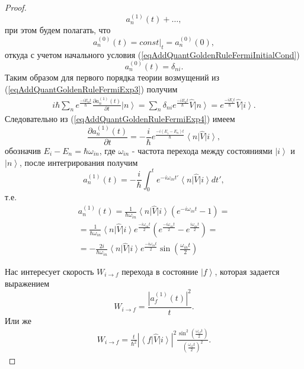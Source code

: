 \begin{proof}
\begin{equation}
    a_n^{(1)}\left(t\right) + \dots,    
    \nonumber
  \end{equation}
  при этом будем полагать, что
  \[
  a_n^{(0)}\left(t\right) = \left.const\right|_t = a_n^{(0)}\left(0\right),
  \]
  откуда с учетом начального условия
  (\ref{eqAddQuantGoldenRuleFermiInitialCond})
  \[
  a_n^{(0)}\left(t\right) = \delta_{ni}.
  \]
  Таким образом для первого порядка теории возмущений из
  (\ref{eqAddQuantGoldenRuleFermiExp3}) получим
  \begin{eqnarray}
    i \hbar \sum_n  e^{\frac{-i E_n t}{\hbar}}
    \frac{ \partial a_n^{(1)}\left(t\right)}{\partial t } \left|n\right> =
     \sum_n  \delta_{ni} 
     e^{\frac{-i E_n t}{\hbar}} \hat{V} \left|n\right> =
     e^{\frac{-i E_i t}{\hbar}} \hat{V} \left|i\right>.
    \label{eqAddQuantGoldenRuleFermiExp4}
  \end{eqnarray}
  Следовательно из (\ref{eqAddQuantGoldenRuleFermiExp4}) имеем
  \begin{equation}
    \frac{ \partial a_n^{(1)}\left(t\right)}{\partial t }  =
    - \frac{i}{\hbar} e^{\frac{-i \left(E_i - E_n\right) t}{\hbar}}
    \left<n\right|\hat{V}\left|i\right>,
    \nonumber
  \end{equation}
  обозначив $E_i - E_n = \hbar \omega_{in}$, где $\omega_{in}$ -
  частота перехода между состояниями $\left|i\right>$ и
  $\left|n\right>$, после интегрирования получим
  \begin{equation}
  a_n^{(1)}\left(t\right)  =
    - \frac{i}{\hbar} \int_0^t e^{-i \omega_{in} t'}
    \left<n\right|\hat{V}\left|i\right> dt',
    \nonumber
  \end{equation}
  т.е.
  \begin{eqnarray}
  a_n^{(1)}\left(t\right)  =
  \frac{1}{\hbar \omega_{in}} \left<n\right|\hat{V}\left|i\right>
  \left(e^{-i \omega_{in} t} -  1\right) =
  \\ \nonumber =
  \frac{1}{\hbar \omega_{in}} \left<n\right|\hat{V}\left|i\right>
  e^{\frac{-i \omega_{in} t}{2}}
  \left(e^{\frac{-i \omega_{in} t}{2}} -  e^{\frac{i \omega_{in}
      t}{2}}\right) =
  \\ \nonumber
  =
  - \frac{2 i}{\hbar \omega_{in}} \left<n\right|\hat{V}\left|i\right>
  e^{\frac{-i \omega_{in} t}{2}}
  \sin\left(\frac{ \omega_{in} t}{2}\right)
  \nonumber
  \end{eqnarray}
  
  
  Нас интересует скорость $W_{i \rightarrow f}$ перехода в
  состояние $\left|f\right>$, которая задается выражением
  \[
  W_{i \rightarrow f} = \frac{\left|a_f^{(1)}\left(t\right)\right|^2}{t}.
  \]
  Или же
  \begin{eqnarray}
    W_{i \rightarrow f} =
    \frac{t}{\hbar^2}
    \left|\left<f\right|\hat{V}\left|i\right>\right|^2
    \frac{\sin^2\left(\frac{ \omega_{if} t}{2}\right)}
         {\left(\frac{ \omega_{if} t}{2}\right)^2}.
    \label{eqAddQuantGoldenRuleFermiExp5}
  \end{eqnarray}


\end{proof}
